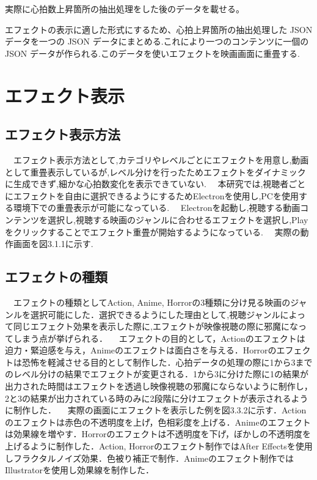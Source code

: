 実際に心拍数上昇箇所の抽出処理をした後のデータを載せる。

エフェクトの表示に適した形式にするため、心拍上昇箇所の抽出処理した JSON データを一つの JSON データにまとめる.これにより一つのコンテンツに一個の JSON データが作られる.このデータを使いエフェクトを映画画面に重畳する.

\section{エフェクト表示}

\subsection{エフェクト表示方法}
　エフェクト表示方法として,カテゴリやレベルごとにエフェクトを用意し,動画として重畳表示しているが,レベル分けを行ったためエフェクトをダイナミックに生成できず,細かな心拍数変化を表示できていない.
　本研究では,視聴者ごとにエフェクトを自由に選択できるようにするためElectronを使用し,PCを使用する環境下での重畳表示が可能になっている.
　Electronを起動し,視聴する動画コンテンツを選択し,視聴する映画のジャンルに合わせるエフェクトを選択し,Playをクリックすることでエフェクト重畳が開始するようになっている.
　実際の動作画面を図3.1.1に示す.


\subsection{エフェクトの種類}
　エフェクトの種類としてAction, Anime, Horrorの3種類に分け見る映画のジャンルを選択可能にした．選択できるようにした理由として,視聴ジャンルによって同じエフェクト効果を表示した際に,エフェクトが映像視聴の際に邪魔になってしまう点が挙げられる．
　エフェクトの目的として，Actionのエフェクトは迫力・緊迫感を与え，Animeのエフェクトは面白さを与える．Horrorのエフェクトは恐怖を軽減させる目的として制作した．心拍データの処理の際に1から3までのレベル分けの結果でエフェクトが変更される．1から3に分けた際に1の結果が出力された時間はエフェクトを透過し映像視聴の邪魔にならないように制作し，2と3の結果が出力されている時のみに2段階に分けエフェクトが表示されるように制作した．
　実際の画面にエフェクトを表示した例を図3.3.2に示す．Actionのエフェクトは赤色の不透明度を上げ，色相彩度を上げる．Animeのエフェクトは効果線を増やす．Horrorのエフェクトは不透明度を下げ，ぼかしの不透明度を上げるように制作した．Action, Horrorのエフェクト制作ではAfter Effectsを使用しフラクタルノイズ効果．色被り補正で制作．Animeのエフェクト制作ではIllustratorを使用し効果線を制作した．

